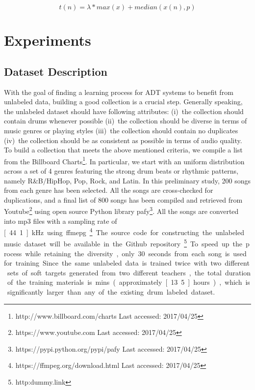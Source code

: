 \documentclass{article}
\begin{document}
\begin{equation}\label{eq:medianThres}
t(n) = \lambda * max(x) + median(x(n), p)
\end{equation} 

\section{Experiments}\label{sec:experiments}
\subsection{Dataset Description}
With the goal of finding a learning process for ADT systems to benefit from unlabeled data, building a good collection is a crucial step. Generally speaking, the unlabeled dataset should have following attributes: (i)~the collection should contain drums whenever possible (ii)~the collection should be diverse in terms of music genres or playing styles (iii)~the collection should contain no duplicates (iv)~the collection should be as consistent as possible in terms of audio quality. To build a collection that meets the above mentioned criteria, we compile a list from the Billboard Charts\footnote{http://www.billboard.com/charts Last accessed: 2017/04/25}. In particular, we start with an uniform distribution across a set of 4 genres featuring the strong drum beats or rhythmic patterns, namely R\&B$\slash$HipHop, Pop, Rock, and Latin. In this preliminary study, 200 songs from each genre has been selected. All the songs are cross-checked for duplications, and a final list of 800 songs has been compiled and retrieved from Youtube\footnote{https://www.youtube.com Last accessed: 2017/04/25} using open source Python library pafy\footnote{https://pypi.python.org/pypi/pafy Last accessed: 2017/04/25}. All the songs are converted into mp3 files with a sampling rate of \unit[44.1]{kHz} using ffmepg\footnote{https://ffmpeg.org/download.html Last accessed: 2017/04/25}. The source code for constructing the unlabeled music dataset will be available in the Github repository\footnote{http:dummy.link}. To speed up the process while retaining the diversity, only 30 seconds from each song is used for training. Since the same unlabeled data is trained twice with two different sets of soft targets generated from two different teachers, the total duration of the training materials is \unit[800]{mins} (approximately \unit[13.5]{hours}), which is significantly larger than any of the existing drum labeled dataset. 
\end{document}
